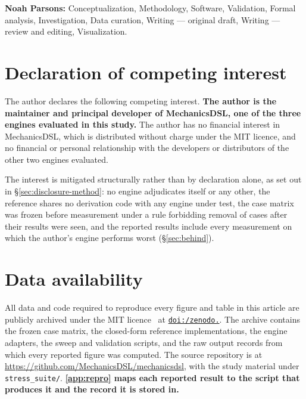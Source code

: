 \documentclass[review,12pt]{elsarticle}
\begin{document}
\textbf{Noah Parsons:} Conceptualization, Methodology, Software, Validation,
Formal analysis, Investigation, Data curation, Writing --- original draft,
Writing --- review and editing, Visualization.

\section*{Declaration of competing interest}

The author declares the following competing interest. \textbf{The author is the
maintainer and principal developer of MechanicsDSL, one of the three engines
evaluated in this study.} The author has no financial interest in MechanicsDSL,
which is distributed without charge under the MIT licence, and no financial or
personal relationship with the developers or distributors of the other two
engines evaluated.

The interest is mitigated structurally rather than by declaration alone, as set
out in \S\ref{sec:disclosure-method}: no engine adjudicates itself or any other,
the reference shares no derivation code with any engine under test, the case
matrix was frozen before measurement under a rule forbidding removal of cases
after their results were seen, and the reported results include every measurement
on which the author's engine performs worst (\S\ref{sec:behind}).

\section*{Data availability}

All data and code required to reproduce every figure and table in this article
are publicly archived under the MIT licence~\cite{parsons2026data} at
\href{https://doi.org/10.5281/zenodo.22315172}{\texttt{doi:/\allowbreak zenodo.}}.
The archive contains the frozen case matrix, the closed-form reference
implementations, the engine adapters, the sweep and validation scripts, and the
raw output records from which every reported figure was computed. The source
repository is at \url{https://github.com/MechanicsDSL/mechanicsdsl}, with the
study material under \texttt{stress\_suite/}. \textbf{\ref{app:repro} maps each
reported result to the script that produces it and the record it is stored in.}
\end{document}
